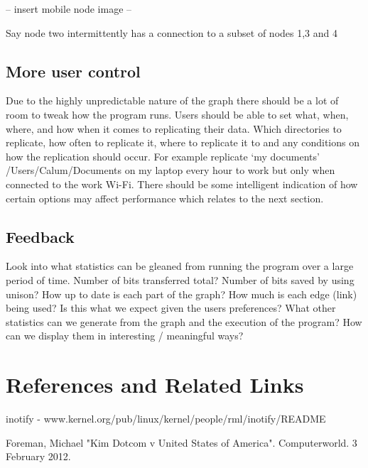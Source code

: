 \documentclass[12pt]{article}
\begin{document}
-- insert mobile node image --

Say node two intermittently has a connection to a subset of
nodes 1,3 and 4

\subsection{More user control}

Due to the highly unpredictable nature of the graph there
should be a lot of room to tweak how the program runs. 
Users should be able to set what, when, where, and how when
it comes to replicating their data. Which directories to replicate,
how often to replicate it, where to replicate it to and any
conditions on how the replication should occur. 
For example replicate
‘my documents’ /Users/Calum/Documents on my laptop every hour to
work but only when connected to the work Wi-Fi.
There should be some intelligent indication of how certain options
may affect performance which relates to the next section.

\subsection{Feedback}
Look into what statistics can be gleaned from running
the program over a large period of time.
Number of bits transferred total? Number of bits saved by
using unison? How up to date is each part of the graph?
How much is each edge (link) being used? Is this what we
expect given the users preferences? What other statistics
can we generate from the graph and the execution of the
program? How can we display them in interesting / meaningful ways?

\section{References and Related Links}
inotify - www.kernel.org/pub/linux/kernel/people/rml/inotify/README

\begin{thebibliography}{9}

Foreman, Michael "Kim Dotcom v United States of America". Computerworld. 3 February 2012.

\end{thebibliography}
\end{document}
